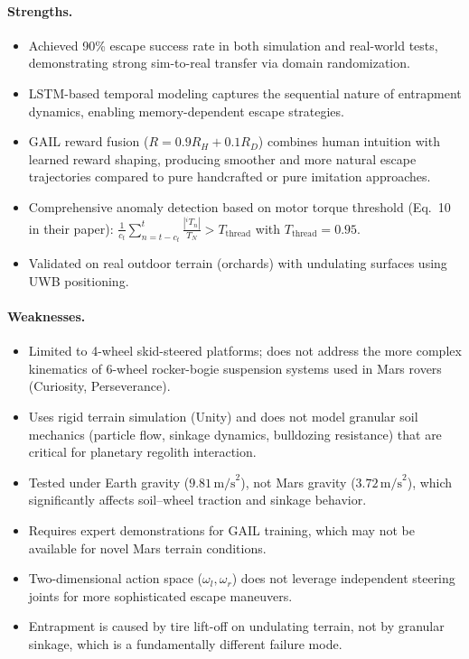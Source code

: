 \documentclass[12pt,a4paper]{article}
\begin{document}
\paragraph{Strengths.}
\begin{itemize}
    \item Achieved 90\% escape success rate in both simulation and real-world tests, demonstrating strong sim-to-real transfer via domain randomization.
    \item LSTM-based temporal modeling captures the sequential nature of entrapment dynamics, enabling memory-dependent escape strategies.
    \item GAIL reward fusion ($R = 0.9R_H + 0.1R_D$) combines human intuition with learned reward shaping, producing smoother and more natural escape trajectories compared to pure handcrafted or pure imitation approaches.
    \item Comprehensive anomaly detection based on motor torque threshold (Eq.~10 in their paper): $\frac{1}{c_t}\sum_{n=t-c_t}^{t}\frac{|^iT_n|}{T_N} > T_{\text{thread}}$ with $T_{\text{thread}} = 0.95$.
    \item Validated on real outdoor terrain (orchards) with undulating surfaces using UWB positioning.
\end{itemize}

\paragraph{Weaknesses.}
\begin{itemize}
    \item Limited to 4-wheel skid-steered platforms; does not address the more complex kinematics of 6-wheel rocker-bogie suspension systems used in Mars rovers (Curiosity, Perseverance).
    \item Uses rigid terrain simulation (Unity) and does not model granular soil mechanics (particle flow, sinkage dynamics, bulldozing resistance) that are critical for planetary regolith interaction.
    \item Tested under Earth gravity ($9.81\,\text{m/s}^2$), not Mars gravity ($3.72\,\text{m/s}^2$), which significantly affects soil--wheel traction and sinkage behavior.
    \item Requires expert demonstrations for GAIL training, which may not be available for novel Mars terrain conditions.
    \item Two-dimensional action space ($\omega_l, \omega_r$) does not leverage independent steering joints for more sophisticated escape maneuvers.
    \item Entrapment is caused by tire lift-off on undulating terrain, not by granular sinkage, which is a fundamentally different failure mode.
\end{itemize}
\end{document}
